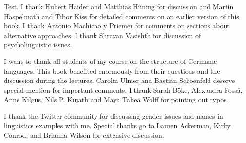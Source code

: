 \addchap{\lsAcknowledgementTitle} 

Test. I thank Hubert Haider and Matthias Hüning for discussion and Martin Haspelmath and Tibor Kiss for detailed comments
on an earlier version of this book. I thank Antonio Machicao y Priemer for comments on sections
about alternative approaches. I thank Shravan Vasishth for discussion of psycholinguistic issues.

I want to thank all students of my course on the structure of Germanic languages. This book
benefited enormously from their questions and the discussion during the lectures. 
Carolin Ulmer %
and
Bastian Schoenfeld %
deserve special mention for important comments. I thank 
Sarah Böke,
Alexandra Fosså,
Anne Kilgus,
Nils P. Kujath
and 
Maya Tabea Wolff  
for pointing out typos.


I thank the Twitter community for discussing gender issues and names in linguistics examples with
me. Special thanks go to Lauren Ackerman, Kirby Conrod, and Brianna Wilson for extensive discussion.




